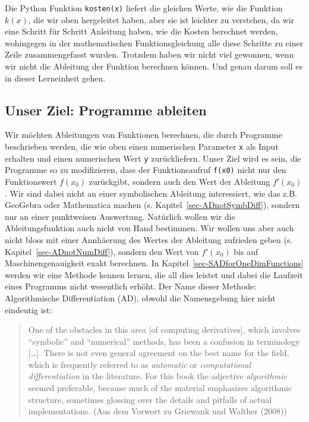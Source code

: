 \documentclass[
  a4paper,
  DIV=11]{scrreprt}
\theoremstyle{definition}
\theoremstyle{definition}
\theoremstyle{remark}
\begin{document}
Die Python Funktion \texttt{kosten(x)} liefert die gleichen Werte, wie
die Funktion \(k(x)\), die wir oben hergeleitet haben, aber sie ist
leichter zu verstehen, da wir eine Schritt für Schritt Anleitung haben,
wie die Kosten berechnet werden, wohingegen in der mathematischen
Funktionsgleichung alle diese Schritte zu einer Zeile zusammengefasst
wurden. Trotzdem haben wir nicht viel gewonnen, wenn wir nicht die
Ableitung der Funktion berechnen können. Und genau darum soll es in
dieser Lerneinheit gehen.

\hypertarget{unser-ziel-programme-ableiten}{%
\subsection{Unser Ziel: Programme
ableiten}\label{unser-ziel-programme-ableiten}}

Wir möchten Ableitungen von Funktionen berechnen, die durch Programme
beschrieben werden, die wie oben einen numerischen Parameter \texttt{x}
als Input erhalten und einen numerischen Wert \texttt{y} zurückliefern.
Unser Ziel wird es sein, die Programme so zu modifizieren, dass der
Funktionsaufruf \texttt{f(x0)} nicht nur den Funktionswert \(f(x_0)\)
zurückgibt, sondern auch den Wert der Ableitung \(f'(x_0)\). Wir sind
dabei nicht an einer symbolischen Ableitung interessiert, wie das z.B.
GeoGebra oder Mathematica machen (s. Kapitel~\ref{sec-ADnotSymbDiff}),
sondern nur an einer punktweisen Auswertung. Natürlich wollen wir die
Ableitungsfunktion auch nicht von Hand bestimmen. Wir wollen uns aber
auch nicht bloss mit einer Annhäerung des Wertes der Ableitung zufrieden
geben (s. Kapitel~\ref{sec-ADnotNumDiff}), sondern den Wert von
\(f'(x_0)\) bis auf Maschinengenauigkeit exakt berechnen. In
Kapitel~\ref{sec-SADforOneDimFunctions} werden wir eine Methode kennen
lernen, die all dies leistet und dabei die Laufzeit eines Programms
nicht wesentlich erhöht. Der Name dieser Methode: Algorithmische
Differentiation (AD), obwohl die Namensgebung hier nicht eindeutig ist:

\begin{quote}
One of the obstacles in this area {[}of computing derivatives{]}, which
involves ``symbolic'' and ``numerical'' methods, has been a confusion in
terminology {[}\ldots{]}. There is not even general agreement on the
best name for the field, which is frequently referred to as
\emph{automatic} or \emph{computational differentiation} in the
literature. For this book the adjective \emph{algorithmic} seemed
preferable, because much of the material emphasizes algorithmic
structure, sometimes glossing over the details and pitfalls of actual
implementations. (Aus dem Vorwort zu Griewank und Walther (2008))
\end{quote}
\end{document}
